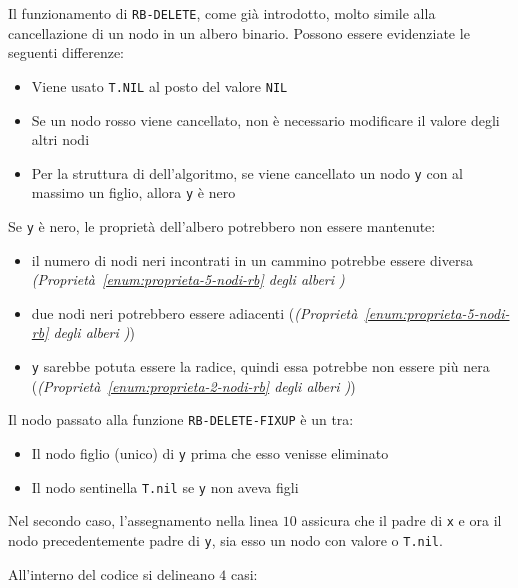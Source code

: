 \documentclass[italian, 10pt]{article}
\begin{document}
\bigskip
Il funzionamento di \texttt{RB-DELETE}, come già introdotto, molto simile alla cancellazione di un nodo in un albero binario.
Possono essere evidenziate le seguenti differenze:

\begin{itemize}
  \item Viene usato \texttt{T.NIL} al posto del valore \texttt{NIL}
  \item Se un nodo rosso viene cancellato, non è necessario modificare il valore degli altri nodi
  \item Per la struttura di dell'algoritmo, se viene cancellato un nodo \texttt{y} con al massimo un figlio, allora \texttt{y} è nero
\end{itemize}

Se \texttt{y} è nero, le proprietà dell'albero \RB potrebbero non essere mantenute:

\begin{itemize}
  \item il numero di nodi neri incontrati in un cammino potrebbe essere diversa \textit{(Proprietà~\ref{enum:proprieta-5-nodi-rb} degli alberi \RB)}
  \item due nodi neri potrebbero essere adiacenti (\textit{(Proprietà~\ref{enum:proprieta-5-nodi-rb} degli alberi \RB)})
  \item \texttt{y} sarebbe potuta essere la radice, quindi essa potrebbe non essere più nera (\textit{(Proprietà~\ref{enum:proprieta-2-nodi-rb} degli alberi \RB)})
\end{itemize}

\bigskip
Il nodo passato alla funzione \texttt{RB-DELETE-FIXUP} è un tra:

\begin{itemize}
  \item Il nodo figlio (unico) di \texttt{y} prima che esso venisse eliminato
  \item Il nodo sentinella \texttt{T.nil} se \texttt{y} non aveva figli
\end{itemize}

Nel secondo caso, l'assegnamento nella linea \(10\) assicura che il padre di \texttt{x} e ora il nodo precedentemente padre di \texttt{y}, sia esso un nodo con valore o \texttt{T.nil}.

All'interno del codice si delineano \(4\) casi:
\end{document}
